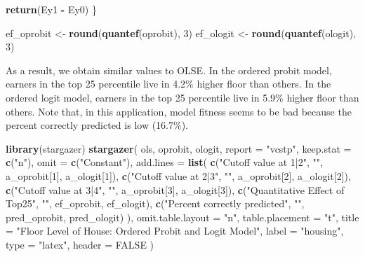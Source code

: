 \documentclass[
  12pt,
]{article}
\newenvironment{Shaded}{\begin{snugshade}}{\end{snugshade}}
\newcommand{\DataTypeTok}[1]{\textcolor[rgb]{0.13,0.29,0.53}{#1}}
\newcommand{\DecValTok}[1]{\textcolor[rgb]{0.00,0.00,0.81}{#1}}
\newcommand{\KeywordTok}[1]{\textcolor[rgb]{0.13,0.29,0.53}{\textbf{#1}}}
\newcommand{\NormalTok}[1]{#1}
\newcommand{\OperatorTok}[1]{\textcolor[rgb]{0.81,0.36,0.00}{\textbf{#1}}}
\newcommand{\OtherTok}[1]{\textcolor[rgb]{0.56,0.35,0.01}{#1}}
\newcommand{\StringTok}[1]{\textcolor[rgb]{0.31,0.60,0.02}{#1}}
\begin{document}
\begin{Shaded}
\begin{Highlighting}[]
  \KeywordTok{return}\NormalTok{(Ey1 }\OperatorTok{{-}}\StringTok{ }\NormalTok{Ey0)}
\NormalTok{\} }

\NormalTok{ef\_oprobit \textless{}{-}}\StringTok{ }\KeywordTok{round}\NormalTok{(}\KeywordTok{quantef}\NormalTok{(oprobit), }\DecValTok{3}\NormalTok{)}
\NormalTok{ef\_ologit \textless{}{-}}\StringTok{ }\KeywordTok{round}\NormalTok{(}\KeywordTok{quantef}\NormalTok{(ologit), }\DecValTok{3}\NormalTok{)}
\end{Highlighting}
\end{Shaded}

As a result, we obtain similar values to OLSE. In the ordered probit
model, earners in the top 25 percentile live in 4.2\% higher floor than
others. In the ordered logit model, earners in the top 25 percentile
live in 5.9\% higher floor than others. Note that, in this application,
model fitness seems to be bad because the percent correctly predicted is
low (16.7\%).

\begin{Shaded}
\begin{Highlighting}[]
\KeywordTok{library}\NormalTok{(stargazer)}
\KeywordTok{stargazer}\NormalTok{(}
\NormalTok{  ols, oprobit, ologit,}
  \DataTypeTok{report =} \StringTok{"vcstp"}\NormalTok{, }\DataTypeTok{keep.stat =} \KeywordTok{c}\NormalTok{(}\StringTok{"n"}\NormalTok{),}
  \DataTypeTok{omit =} \KeywordTok{c}\NormalTok{(}\StringTok{"Constant"}\NormalTok{),}
  \DataTypeTok{add.lines =} \KeywordTok{list}\NormalTok{(}
    \KeywordTok{c}\NormalTok{(}\StringTok{"Cutoff value at 1|2"}\NormalTok{, }\StringTok{""}\NormalTok{, a\_oprobit[}\DecValTok{1}\NormalTok{], a\_ologit[}\DecValTok{1}\NormalTok{]),}
    \KeywordTok{c}\NormalTok{(}\StringTok{"Cutoff value at 2|3"}\NormalTok{, }\StringTok{""}\NormalTok{, a\_oprobit[}\DecValTok{2}\NormalTok{], a\_ologit[}\DecValTok{2}\NormalTok{]),}
    \KeywordTok{c}\NormalTok{(}\StringTok{"Cutoff value at 3|4"}\NormalTok{, }\StringTok{""}\NormalTok{, a\_oprobit[}\DecValTok{3}\NormalTok{], a\_ologit[}\DecValTok{3}\NormalTok{]),}
    \KeywordTok{c}\NormalTok{(}\StringTok{"Quantitative Effect of Top25"}\NormalTok{, }\StringTok{""}\NormalTok{, ef\_oprobit, ef\_ologit),}
    \KeywordTok{c}\NormalTok{(}\StringTok{"Percent correctly predicted"}\NormalTok{, }\StringTok{""}\NormalTok{, pred\_oprobit, pred\_ologit)}
\NormalTok{  ),}
  \DataTypeTok{omit.table.layout =} \StringTok{"n"}\NormalTok{, }\DataTypeTok{table.placement =} \StringTok{"t"}\NormalTok{,}
  \DataTypeTok{title =} \StringTok{"Floor Level of House: Ordered Probit and Logit Model"}\NormalTok{,}
  \DataTypeTok{label =} \StringTok{"housing"}\NormalTok{,}
  \DataTypeTok{type =} \StringTok{"latex"}\NormalTok{, }\DataTypeTok{header =} \OtherTok{FALSE}
\NormalTok{)}
\end{Highlighting}
\end{Shaded}
\end{document}
